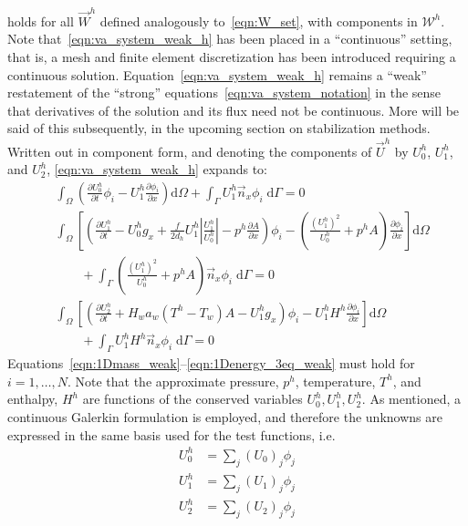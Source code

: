holds for all $\vec{W}^h$ defined analogously to~\eqref{eqn:W_set},
with components in $\mathcal{W}^h$. Note that~\eqref{eqn:va_system_weak_h} 
has been placed in a ``continuous'' setting, that is, a mesh and finite element
discretization has been introduced requiring a continuous solution.  
Equation~\eqref{eqn:va_system_weak_h} remains a ``weak'' restatement of the ``strong'' 
equations~\eqref{eqn:va_system_notation} in the sense that derivatives of the  
solution and its flux need not be continuous. More will be said of this subsequently,
in the upcoming section on stabilization methods.  Written out in component form,
and denoting the components of $\vec{U}^h$ by $U_0^h$, $U_1^h$, and
$U_2^h$, \eqref{eqn:va_system_weak_h} expands to:
\begin{align}
  \label{eqn:1Dmass_weak}
  &
  \int_{\Omega} \left( \frac{\partial U_0^h}{\partial t} \phi_i -
    U_1^h \frac{\partial \phi_i}{\partial x} \right) \text{d}{\Omega}
  + \int_{\Gamma} U_1^h \vec{n}_x \phi_i \; \text{d}{\Gamma} = 0
  \\[12pt]
  \nonumber
  &
  \int_{\Omega} \left[ \left(\frac{\partial U_1^h}{\partial t}
      - U_0^h g_x + \frac{f}{2 d_h}  U_1^h \left|\frac{U_1^h}{U_0^h}\right| - p^h \frac{\partial A}{\partial x} \right) \phi_i
    - \left( \frac{(U_1^h)^2}{U_0^h} + p^hA \right) \frac{\partial\phi_i }{\partial x} \right] \text{d}{\Omega}
  \\
  \label{eqn:1Dmomentum_weak}
  &\qquad + \int_{\Gamma} \left( \frac{(U_1^h)^2}{U_0^h} + p^hA \right) \vec{n}_x \phi_i \; \text{d}{\Gamma} = 0
  \\[12pt]
  \nonumber
  &
  \int_{\Omega}
  \left[
  \left(
    \frac{\partial U_2^h}{\partial t} + H_w a_w (T^h-T_w) A - U_1^h g_x
  \right)
  \phi_i
    -  U_1^h H^h \frac{\partial \phi_i}{\partial x}
  \right]
  \text{d}{\Omega}
  \\
  \label{eqn:1Denergy_3eq_weak}
  &\qquad
  +
  \int_{\Gamma} U_1^h H^h \vec{n}_x \phi_i \; \text{d}{\Gamma} = 0
\end{align}
Equations~\eqref{eqn:1Dmass_weak}--\eqref{eqn:1Denergy_3eq_weak} must
hold for $i=1,\ldots,N$.  Note that the approximate pressure, $p^h$,
temperature, $T^h$, and enthalpy, $H^h$ are functions of the conserved
variables $U_0^h, U_1^h, U_2^h$.  As mentioned, a continuous
Galerkin formulation is employed, and therefore the unknowns are expressed in
the same basis used for the test functions, i.e.
\begin{align}
  U_0^h &= \sum_j (U_0)_j \phi_j
  \\
  U_1^h &= \sum_j (U_1)_j \phi_j
  \\
  U_2^h &= \sum_j (U_2)_j \phi_j
\end{align}
